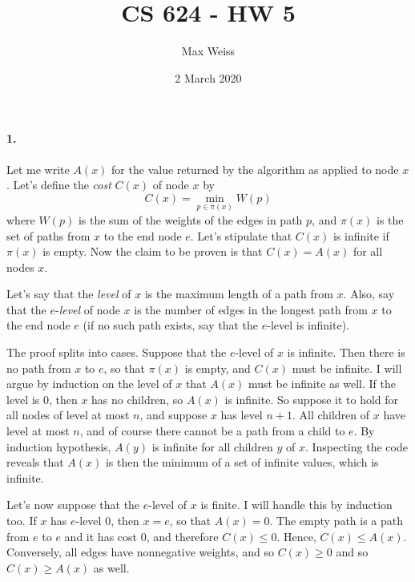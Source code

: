 \documentclass[
]{article}
\date{2 March 2020}
\title{CS 624 - HW 5}
\author{Max Weiss}
\begin{document}
\maketitle



\paragraph{1.}
Let me write $A(x)$ for the value returned by the algorithm as applied to node $x$.  Let's define the \emph{cost} $C(x)$ of node $x$ by
\begin{equation}
\label{defCost}
C(x) =\min_{p\in \pi(x)}W(p)
\end{equation}
where $W(p)$ is the sum of the weights of the edges in path $p$,
and $\pi(x)$ is the set of paths from $x$ to the end node $e$.  Let's stipulate that $C(x)$ is infinite if $\pi(x)$ is empty.  Now the claim to be proven is that $C(x)=A(x)$ for all nodes $x$.

Let's say that the \emph{level} of $x$ is the maximum length of a path from $x$.  Also, say that the $e$-\emph{level} of node $x$ is the number of edges in the longest path from $x$ to the end node $e$ (if no such path exists, say that the $e$-level is infinite).  

The proof splits into cases.  Suppose that the $e$-level of $x$ is infinite.  Then there is no path from $x$ to $e$, so that $\pi(x)$ is empty, and $C(x)$ must be infinite.  I will argue by induction on the level of $x$ that $A(x)$ must be infinite as well.  If the level is $0$, then $x$ has no children, so $A(x)$ is infinite.  So suppose it to hold for all nodes of level at most $n$, and suppose $x$ has level $n+1$.  All children of $x$ have level at most $n$, and of course there cannot be a path from a child to $e$.  By induction hypothesis, $A(y)$ is infinite for all children $y$ of $x$.  Inspecting the code reveals that $A(x)$ is then the minimum of a set of infinite values, which is infinite.

Let's now suppose that the $e$-level of $x$ is finite.  I will handle this by induction too.  If $x$ has $e$-level $0$, then $x=e$, so that $A(x)=0$. The empty path is a path from $e$ to $e$ and it has cost $0$, and therefore $C(x)\leq 0$.  Hence, $C(x)\leq A(x)$.  Conversely, all edges have nonnegative weights, and so $C(x)\geq 0$ and so $C(x)\geq A(x)$ as well.
\end{document}
